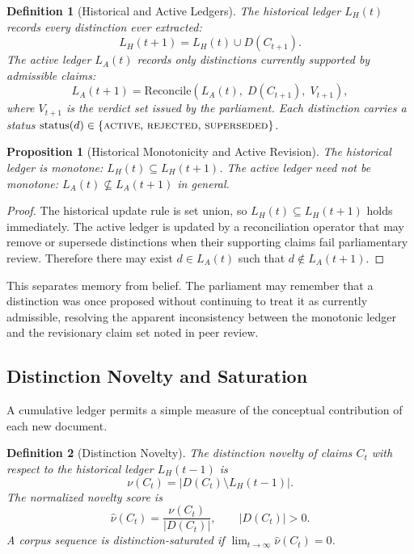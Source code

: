 \documentclass[12pt, a4paper]{article}
\newtheorem{definition}{Definition}[section]
\newtheorem{proposition}{Proposition}[section]
\theoremstyle{principle}
\theoremstyle{definition}
\begin{document}
\begin{definition}[Historical and Active Ledgers]
The \emph{historical ledger} $L_H(t)$ records every distinction ever extracted:
\[
L_H(t+1) = L_H(t) \cup D(C_{t+1}).
\]
The \emph{active ledger} $L_A(t)$ records only distinctions currently supported
by admissible claims:
\[
L_A(t+1) = \mathrm{Reconcile}(L_A(t),\; D(C_{t+1}),\; V_{t+1}),
\]
where $V_{t+1}$ is the verdict set issued by the parliament.
Each distinction carries a status $\mathrm{status}(d) \in
\{\textup{\textsc{active}},\, \textup{\textsc{rejected}},\, \textup{\textsc{superseded}}\}$.
\end{definition}

\begin{proposition}[Historical Monotonicity and Active Revision]
\label{prop:memory}
The historical ledger is monotone: $L_H(t) \subseteq L_H(t+1)$.
The active ledger need not be monotone: $L_A(t) \not\subseteq L_A(t+1)$ in general.
\end{proposition}

\begin{proof}
The historical update rule is set union, so $L_H(t) \subseteq L_H(t+1)$ holds
immediately. The active ledger is updated by a reconciliation operator that may
remove or supersede distinctions when their supporting claims fail parliamentary
review. Therefore there may exist $d \in L_A(t)$ such that $d \notin L_A(t+1)$.
\end{proof}

This separates memory from belief. The parliament may remember that a distinction
was once proposed without continuing to treat it as currently admissible, resolving
the apparent inconsistency between the monotonic ledger and the revisionary claim
set noted in peer review.

\subsection{Distinction Novelty and Saturation}

A cumulative ledger permits a simple measure of the conceptual contribution of
each new document.

\begin{definition}[Distinction Novelty]
The \emph{distinction novelty} of claims $C_t$ with respect to the historical
ledger $L_H(t-1)$ is
\[
\nu(C_t) = |D(C_t) \setminus L_H(t-1)|.
\]
The normalized novelty score is
\[
\hat{\nu}(C_t) = \frac{\nu(C_t)}{|D(C_t)|}, \qquad |D(C_t)| > 0.
\]
A corpus sequence is \emph{distinction-saturated} if
$\lim_{t \to \infty} \hat{\nu}(C_t) = 0$.
\end{definition}
\end{document}
